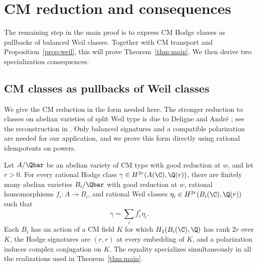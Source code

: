 \section{CM reduction and consequences}
\label{sec:reduction}

The remaining step in the main proof is to express CM Hodge classes
as pullbacks of balanced Weil classes.  Together with CM transport
and Proposition~\ref{prop:weil}, this will prove
Theorem~\ref{thm:main}.  We then derive two specialization consequences.

\subsection{CM classes as pullbacks of Weil classes}

We give the CM reduction in the form needed here.  The stronger
reduction to classes on abelian varieties of split Weil type is due to
Deligne and Andr\'e \cite{Andre1992}; see the reconstruction in
\cite[Theorem~1 and Section~4]{Milne2020}. Only balanced signatures
and a compatible polarization are needed for our application, and
we prove this form directly using rational idempotents on powers.

\begin{lemma}[CM reduction]
\label{lem:cm-reduction}
Let $A/\Qbar$ be an abelian variety of CM type with good reduction at $w$,
and let $r>0$.  For every rational Hodge class
$\gamma\in H^{2r}(A(\C),\Q(r))$, there are finitely many abelian varieties
$B_i/\Qbar$ with good reduction at $w$, rational homomorphisms
$f_i\colon A\to B_i$, and rational Weil classes
$\eta_i\in H^{2r}(B_i(\C),\Q(r))$ such that
\begin{equation}
\label{eq:cm-pullback-decomposition}
                 \gamma=\sum_i f_i^*\eta_i.
\end{equation}
Each $B_i$ has an action of a CM field $K$ for which $H_1(B_i(\C),\Q)$
has rank $2r$ over $K$, the Hodge signatures are $(r,r)$ at every
embedding of $K$, and a polarization induces complex conjugation on $K$.
The equality specializes simultaneously in all the realizations used in
Theorem~\ref{thm:main}.
\end{lemma}

